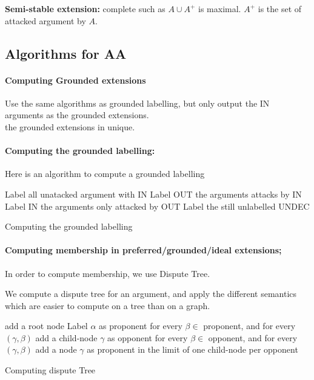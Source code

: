 		\begin{definition}
			\textbf{Semi-stable extension:} complete such as $A\cup A^+$ is maximal. $A^+$ is the set of attacked argument by $A$.
		\end{definition}


	\subsection{Algorithms for AA}

		\paragraph*{Computing Grounded extensions}
		Use the same algorithms as grounded labelling, but only output the IN arguments as the grounded extensions.\\
		the grounded extensions in unique. 

		\paragraph{Computing the grounded labelling:}
		Here is an algorithm to compute a grounded labelling\\

		\begin{algorithm}[H]
			Label all unatacked argument with IN \;
			{
				Label OUT the arguments attacks by IN \;
				Label IN the arguments only attacked by OUT\;
			}
			Label the still unlabelled UNDEC\;
			\caption{Computing the grounded labelling}
		\end{algorithm}

		\paragraph{Computing membership in preferred/grounded/ideal extensions;} In order to compute membership, we use Dispute Tree.

		We compute a dispute tree for an argument, and apply the different semantics which are easier to compute on a tree than on a graph.



		\begin{algorithm}[H]
			add a root node Label $\alpha$ as proponent \;
			{
				for every $\beta \in$ proponent, and for every $(\gamma, \beta)$ add a child-node $\gamma$ as opponent\;
				for every $\beta \in$ opponent, and for every $(\gamma, \beta)$ add a node $\gamma$ as proponent in the limit of one child-node per opponent \;
			}
			\caption{Computing dispute Tree}
		\end{algorithm}


